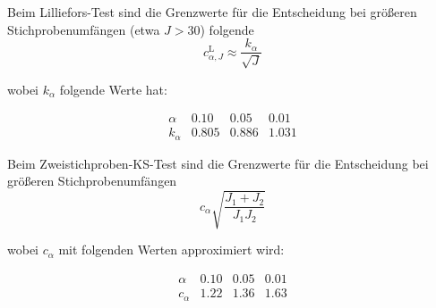 Beim Lilliefors-Test sind die Grenzwerte für die Entscheidung bei größeren Stichprobenumfängen (etwa $J>30$) folgende
\begin{equation*}
  c_{\alpha,J}^{\mathrm L}
  \approx
  \frac{k_\alpha}{\sqrt{J}}
\end{equation*}

wobei $k_\alpha$ folgende Werte hat:

$$
\begin{array}{c|ccc}
\alpha & 0.10 & 0.05 & 0.01\\
\hline
k_\alpha & 0.805 & 0.886 & 1.031
\end{array}
$$

Beim Zweistichproben-KS-Test sind die Grenzwerte für die Entscheidung bei größeren Stichprobenumfängen
\begin{equation}
c_\alpha \sqrt{\frac{J_1+J_2}{J_1J_2}}
\end{equation}

wobei $c_\alpha$ mit folgenden Werten approximiert wird:

$$
\begin{array}{c|ccc}
\alpha & 0.10 & 0.05 & 0.01\\
\hline
c_\alpha & 1.22 & 1.36 & 1.63
\end{array}
$$


